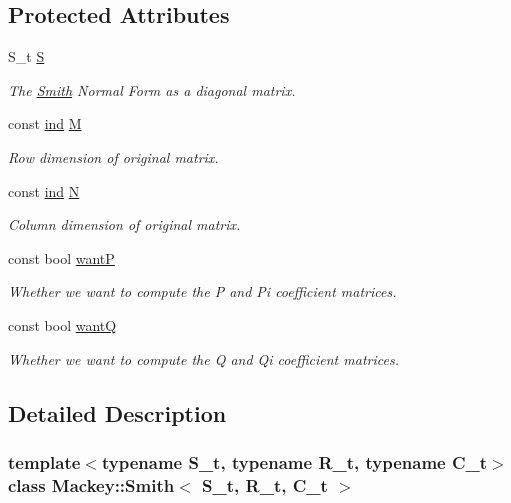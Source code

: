 \subsection*{Protected Attributes}
\begin{DoxyCompactItemize}
\item 
S\+\_\+t \hyperlink{classMackey_1_1Smith_a2c4e977af966b2956354dce7e40dd5e1}{S}
\begin{DoxyCompactList}\small\item\em The \hyperlink{classMackey_1_1Smith}{Smith} Normal Form as a diagonal matrix. \end{DoxyCompactList}\item 
const \hyperlink{classMackey_1_1Smith_acf2eec378d950576afd70dc941cad0c4}{ind} \hyperlink{classMackey_1_1Smith_aa4bddfb9796689478f536486bb5d5524}{M}
\begin{DoxyCompactList}\small\item\em Row dimension of original matrix. \end{DoxyCompactList}\item 
const \hyperlink{classMackey_1_1Smith_acf2eec378d950576afd70dc941cad0c4}{ind} \hyperlink{classMackey_1_1Smith_a9598fe3978cc86a83e4f3b03a418ad5c}{N}
\begin{DoxyCompactList}\small\item\em Column dimension of original matrix. \end{DoxyCompactList}\item 
const bool \hyperlink{classMackey_1_1Smith_a7033b338fda868e33f50950d2444ae75}{wantP}
\begin{DoxyCompactList}\small\item\em Whether we want to compute the P and Pi coefficient matrices. \end{DoxyCompactList}\item 
const bool \hyperlink{classMackey_1_1Smith_a10ec727132ca15eee9dac0522d617a50}{wantQ}
\begin{DoxyCompactList}\small\item\em Whether we want to compute the Q and Qi coefficient matrices. \end{DoxyCompactList}\end{DoxyCompactItemize}


\subsection{Detailed Description}
\subsubsection*{template$<$typename S\+\_\+t, typename R\+\_\+t, typename C\+\_\+t$>$\newline
class Mackey\+::\+Smith$<$ S\+\_\+t, R\+\_\+t, C\+\_\+t $>$}

